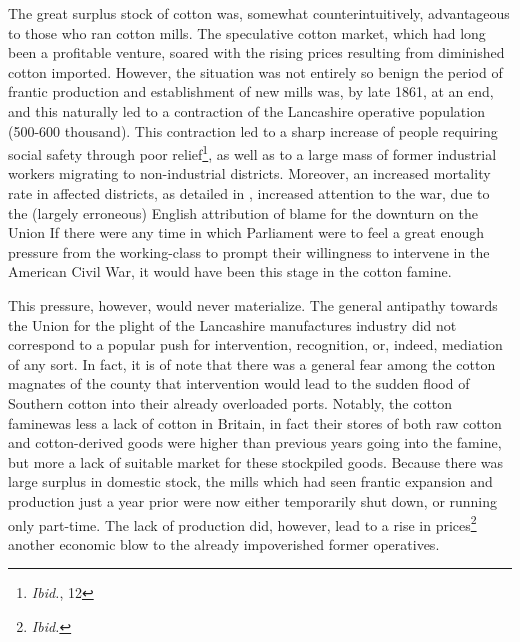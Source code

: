 The great surplus stock of cotton was, somewhat counterintuitively, advantageous to those who ran cotton mills. The speculative cotton market,
which had long been a profitable venture, soared with the rising prices resulting from diminished cotton imported. However, the situation
was not entirely so benign \textemdash the period of frantic production and establishment of new mills was, by late 1861, at an end, and this naturally led to
a contraction of the Lancashire operative population (500-600 thousand\Autocite*[Vol.II, p.13]{adamsBritainAmericanWar1925}). This contraction led to a sharp
increase of people requiring social safety through \flq poor relief\frq\footnote{\textit{Ibid.}, 12},
as well as to a large mass of former industrial workers migrating to non-industrial districts\autocite{arthi2022recessions}. Moreover, an increased mortality rate
in affected districts, as detailed in , increased attention to the war, due to the 
(largely erroneous) English attribution of blame for the downturn on the Union\autocite[229]{arnoldHistoryCotton1864} \textemdash
If there were any time in which Parliament were to feel a great enough pressure from the working-class to prompt their willingness to intervene in the
American Civil War, it would have been this stage in the cotton famine.

This pressure, however, would never materialize. The general antipathy towards the Union for the plight of the Lancashire manufactures industry did not correspond to a popular push for intervention, recognition, or, indeed, mediation of any sort. In fact, it is of note that there was a general fear among the cotton magnates of the county that intervention would lead to the sudden flood of Southern cotton into their already overloaded ports\Autocite[Vol.II, p.11]{adamsBritainAmericanWar1925}. Notably, the \flq cotton famine\frq was less a lack of cotton in Britain, in fact their stores of both raw cotton and cotton-derived goods were higher than previous years going into the famine, but more a lack of suitable market for these stockpiled goods. Because there was large surplus in domestic stock, the mills which had seen frantic expansion and production just a year prior were now either temporarily shut down, or running only part-time. The lack of production did, however, lead to a rise in prices\footnote{\textit{Ibid.}} \textemdash another economic blow to the already impoverished former operatives.

